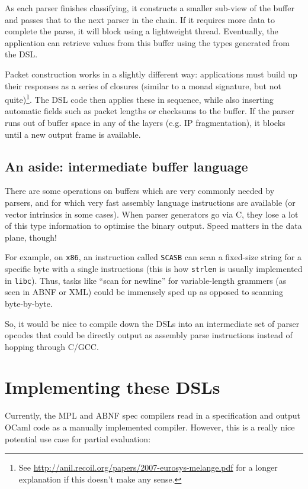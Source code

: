 \documentclass{article}
\begin{document}
As each parser finishes classifying, it constructs a smaller sub-view of the buffer and passes that to the next parser in the chain. If it requires more data to complete the parse, it will block using a lightweight thread. 
Eventually, the application can retrieve values from this buffer using the types generated from the DSL.

Packet construction works in a slightly different way: applications must build up their responses as a series of closures (similar to a monad signature, but not quite)\footnote{See \url{http://anil.recoil.org/papers/2007-eurosys-melange.pdf} for a longer explanation if this doesn't make any sense.}.  The DSL code then applies these in sequence, while also inserting automatic fields such as packet lengths or checksums to the buffer.   If the parser runs out of buffer space in any of the layers (e.g. IP fragmentation), it blocks until a new output frame is available.

\subsection{An aside: intermediate buffer language}

There are some operations on buffers which are very commonly needed by parsers, and for which very fast assembly language instructions are available (or vector intrinsics in some cases).  When parser generators go via C, they lose a lot of this type information to optimise the binary output.  Speed matters in the data plane, though!

For example, on {\tt x86}, an instruction called {\tt SCASB} can scan a fixed-size string for a specific byte with a single instructions (this is how {\tt strlen} is usually implemented in {\tt libc}).  Thus, tasks like ``scan for newline'' for variable-length grammers (as seen in ABNF or XML) could be immensely sped up as opposed to scanning byte-by-byte.

So, it would be nice to compile down the DSLs into an intermediate set of parser opcodes that could be directly output as assembly parse instructions instead of hopping through C/GCC.


\section{Implementing these DSLs}

Currently, the MPL and ABNF spec compilers read in a specification and output OCaml code as a manually implemented compiler.  However, this is a really nice potential use case for partial evaluation: 
\end{document}
